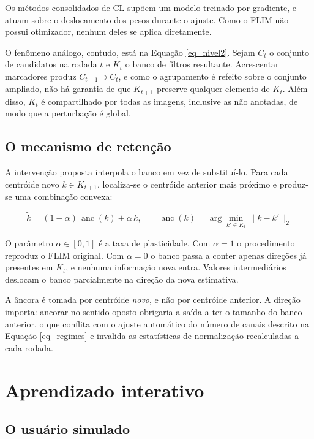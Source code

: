 Os métodos consolidados de \ac{CL} supõem um modelo treinado por gradiente, e atuam sobre o deslocamento dos pesos durante o ajuste. Como o \ac{FLIM} não possui otimizador, nenhum deles se aplica diretamente.

O fenômeno análogo, contudo, está na Equação \ref{eq_nivel2}. Sejam $C_t$ o conjunto de candidatos na rodada $t$ e $K_t$ o banco de filtros resultante. Acrescentar marcadores produz $C_{t+1} \supset C_t$, e como o agrupamento é refeito sobre o conjunto ampliado, não há garantia de que $K_{t+1}$ preserve qualquer elemento de $K_t$. Além disso, $K_t$ é compartilhado por todas as imagens, inclusive as não anotadas, de modo que a perturbação é global.

\subsection{O mecanismo de retenção}

A intervenção proposta interpola o banco em vez de substituí-lo. Para cada centróide novo $k \in K_{t+1}$, localiza-se o centróide anterior mais próximo e produz-se uma combinação convexa:

\begin{equation}
\tilde{k} = (1 - \alpha)\,\operatorname{anc}(k) + \alpha\,k,
\qquad
\operatorname{anc}(k) = \arg\min_{k' \in K_t} \lVert k - k' \rVert_2
\label{eq_retencao}
\end{equation}

O parâmetro $\alpha \in [0,1]$ é a taxa de plasticidade. Com $\alpha = 1$ o procedimento reproduz o \ac{FLIM} original. Com $\alpha = 0$ o banco passa a conter apenas direções já presentes em $K_t$, e nenhuma informação nova entra. Valores intermediários deslocam o banco parcialmente na direção da nova estimativa.

A âncora é tomada por centróide \emph{novo}, e não por centróide anterior. A direção importa: ancorar no sentido oposto obrigaria a saída a ter o tamanho do banco anterior, o que conflita com o ajuste automático do número de canais descrito na Equação \ref{eq_regimes} e invalida as estatísticas de normalização recalculadas a cada rodada.

\section{Aprendizado interativo}

\subsection{O usuário simulado}

